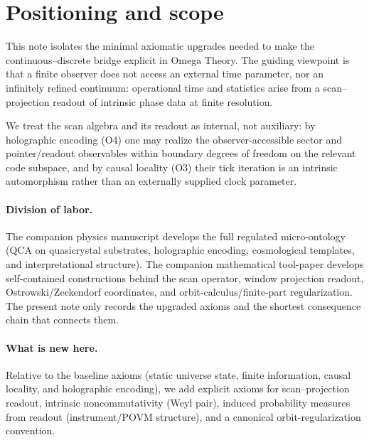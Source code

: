 \section{Positioning and scope}
This note isolates the minimal axiomatic upgrades needed to make the continuous--discrete bridge explicit in Omega Theory. The guiding viewpoint is that a finite observer does not access an external time parameter, nor an infinitely refined continuum: operational time and statistics arise from a scan--projection readout of intrinsic phase data at finite resolution.
\par
We treat the scan algebra and its readout as internal, not auxiliary: by holographic encoding (O4) one may realize the observer-accessible sector and pointer/readout observables within boundary degrees of freedom on the relevant code subspace, and by causal locality (O3) their tick iteration is an intrinsic automorphism rather than an externally supplied clock parameter.

\paragraph{Division of labor.}
The companion physics manuscript \cite{Ma2025FoP} develops the full regulated micro-ontology (QCA on quasicrystal substrates, holographic encoding, cosmological templates, and interpretational structure). The companion mathematical tool-paper \cite{Ma2025HPA} develops self-contained constructions behind the scan operator, window projection readout, Ostrowski/Zeckendorf coordinates, and orbit-calculus/finite-part regularization. The present note only records the upgraded axioms and the shortest consequence chain that connects them.

\paragraph{What is new here.}
Relative to the baseline axioms (static universe state, finite information, causal locality, and holographic encoding), we add explicit axioms for scan--projection readout, intrinsic noncommutativity (Weyl pair), induced probability measures from readout (instrument/POVM structure), and a canonical orbit-regularization convention.
